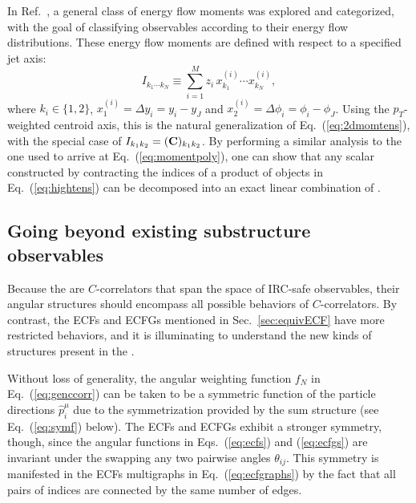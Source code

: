 \documentclass[letterpaper,11pt]{article}
\DeclareRobustCommand{\Sec}[1]{Sec.~\ref{#1}}
\DeclareRobustCommand{\Eq}[1]{Eq.~(\ref{#1})}
\DeclareRobustCommand{\Eqs}[2]{Eqs.~(\ref{#1}) and (\ref{#2})}
\DeclareRobustCommand{\Ref}[1]{Ref.~\cite{#1}}
\newcommand{\Bs}{\text{EFPs}\xspace}
\begin{document}
In \Ref{GurAri:2011vx}, a general class of energy flow moments was explored and categorized, with the goal of classifying observables according to their energy flow distributions.
%
These energy flow moments are defined with respect to a specified jet axis:
%
\begin{equation}\label{eq:hightens}
I_{k_1\cdots k_N} \equiv \sum_{i=1}^M z_i \, x_{k_1}^{(i)}\cdots x_{k_N}^{(i)},
\end{equation}
where $k_i \in \{1,2\}$, $x_1^{(i)} = \Delta  y_i= y_i- y_J$ and $x_2^{(i)} = \Delta\phi_i=\phi_i-\phi_J$.
%
Using the $p_T$-weighted centroid axis, this is the natural generalization of \Eq{eq:2dmomtens}, with the special case of $I_{k_1k_2} = ({\bf C})_{k_1k_2}$.
%
By performing a similar analysis to the one used to arrive at \Eq{eq:momentpoly}, one can show that any scalar constructed by contracting the indices of a product of objects in \Eq{eq:hightens} can be decomposed into an exact linear combination of \Bs.


\subsection{Going beyond existing substructure observables}
\label{subsec:goingbeyond}

Because the \Bs are $C$-correlators that span the space of IRC-safe observables, their angular structures should encompass all possible behaviors of $C$-correlators.
%
By contrast, the ECFs and ECFGs mentioned in \Sec{sec:equivECF} have more restricted behaviors, and it is illuminating to understand the new kinds of structures present in the \Bs.

Without loss of generality, the angular weighting function $f_N$ in \Eq{eq:genccorr} can be taken to be a symmetric function of the particle directions $\hat{p}_i^\mu$ due to the symmetrization provided by the sum structure (see \Eq{eq:symf} below).
%
The ECFs and ECFGs exhibit a stronger symmetry, though, since the angular functions in \Eqs{eq:ecfs}{eq:ecfgs} are invariant under the swapping any two pairwise angles $\theta_{ij}$.
%
This symmetry is manifested in the ECFs multigraphs in \Eq{eq:ecfgraphs} by the fact that all pairs of indices are connected by the same number of edges.
\end{document}

